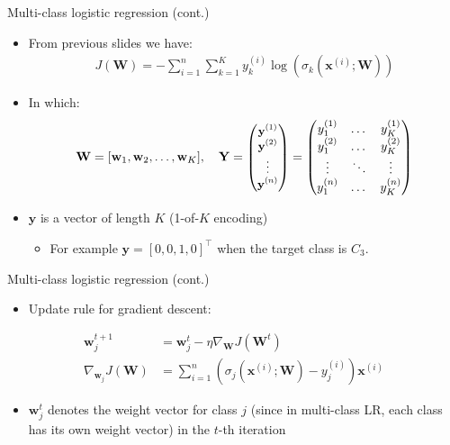 \documentclass[serif, aspectratio=169]{beamer}
\begin{document}
\begin{frame}{Multi-class logistic regression (cont.)}
    \begin{itemize}
        \item From previous slides we have:
            \begin{align*}
                J(\mathbf{W}) = -\sum_{i=1}^{n}\sum_{k=1}^{K}y_k^{(i)} \log (\sigma _k(\mathbf{x}^{(i)}; \mathbf{W}))
            \end{align*}
        \item In which:
             \[
        \mathbf{W} = [\mathbf{w}_1,\mathbf{w}_2, \dots, \mathbf{w}_K], \quad \mathbf{Y} = 
        \text{\small $
        \begin{pmatrix}
            \mathbf{y}^{(1)} \\
            \mathbf{y}^{(2)} \\
            \vdots \\
            \mathbf{y}^{(n)}
        \end{pmatrix}
        $}
        =
        \begin{pmatrix}
            y_1^{(1)} & \dots & y_K^{(1)} \\
            y_1^{(2)} & \dots & y_K^{(2)} \\
            \vdots    & \ddots & \vdots \\
            y_1^{(n)} & \dots & y_K^{(n)}
        \end{pmatrix}
    \]
    
        \item $\mathbf{y}$ is a vector of length $K$ (1-of-$K$ encoding)
            \begin{itemize}
                \item For example $\mathbf{y}=[0,0,1,0]^\top$ when the target class is $C_3$.
            \end{itemize}
    \end{itemize}
\end{frame}
\begin{frame}{Multi-class logistic regression (cont.)}
    \begin{itemize}
        \item Update rule for gradient descent:
        
    \end{itemize}
    \begin{align*}
            \mathbf{w}_j^{t+1} &= \mathbf{w}_j^t - \eta \nabla _{\mathbf{W}} J(\mathbf{W}^t) \\
            \nabla _{\mathbf{w}_{j}} J(\mathbf{W}) &= \sum_{i=1}^{n} (\sigma _j(\mathbf{x}^{(i)}; \mathbf{W}) - y_j^{(i)})\mathbf{x}^{(i)}
        \end{align*}
        
    \begin{itemize}
        \item $\mathbf{w}_j^t$ denotes the weight vector for class $j$ (since in multi-class LR, each class has its own weight vector) in the $t$-th iteration
    \end{itemize}
\end{frame}
\end{document}
